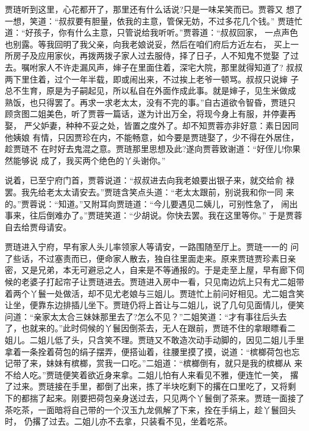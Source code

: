 贾琏听到这里，心花都开了，那里还有什么话说?只是一味呆笑而已。贾蓉又
想了一想，笑道：“叔叔要有胆量，依我的主意，管保无妨，不过多花几个钱。”
贾琏忙道：“好孩子，你有什么主意，只管说给我听听。”贾蓉道：“叔叔回家，
一点声色也别露。等我回明了我父亲，向我老娘说妥，然后在咱们府后方近左右，
买上一所房子及应用家伙，再拨两拨子家人过去服侍，择了日子，人不知鬼不觉娶
了过去。嘱咐家人不许走漏风声，婶子在里面住着，深宅大院，那里就得知道了?
叔叔两下里住着，过个一年半载，即或闹出来，不过挨上老爷一顿骂。叔叔只说婶
子总不生育，原是为子嗣起见，所以私自在外面作成此事。就是婶子，见生米做成
熟饭，也只得罢了。再求一求老太太，没有不完的事。”自古道欲令智昏，贾琏只
顾贪图二姐美色，听了贾蓉一篇话，遂为计出万全，将现今身上有服，并停妻再娶，
严父妒妻，种种不妥之处，皆置之度外了。却不知贾蓉亦非好意：素日因同他姨娘
有情，只因贾珍在内，不能畅意，如今要是贾琏娶了，少不得在外居住，趁贾琏不
在时好去鬼混之意。贾琏那里思想及此?遂向贾蓉致谢道：“好侄儿!你果然能够说
成了，我买两个绝色的丫头谢你。”

说着，已至宁府门首，贾蓉说道：“叔叔进去向我老娘要出银子来，就交给俞
禄罢。我先给老太太请安去。”贾琏含笑点头道：“老太太跟前，别说我和你一同
来的。”贾蓉说：“知道。”又附耳向贾琏道：“今儿要遇见二姨儿，可别性急了，
闹出事来，往后倒难办了。”贾琏笑道：“少胡说。你快去罢。我在这里等你。”
于是贾蓉自去给贾母请安。

贾琏进入宁府，早有家人头儿率领家人等请安，一路围随至厅上。贾琏一一的
问了些话，不过塞责而已，便命家人散去，独自往里面走来。原来贾琏贾珍素日亲
密，又是兄弟，本无可避忌之人，自来是不等通报的。于是走至上屋，早有廊下伺
候的老婆子打起帘子让贾琏进去。贾琏进入房中一看，只见南边炕上只有尤二姐带
着两个丫鬟一处做活，却不见尤老娘与三姐儿。贾琏忙上前问好相见。尤二姐含笑
让坐，便靠东边排插儿坐下。贾琏仍将上首让与二姐儿，说了几句见面情儿，便笑
问道：“亲家太太合三妹妹那里去了?怎么不见？”二姐笑道：“才有事往后头去
了，也就来的。”此时伺候的丫鬟因倒茶去，无人在跟前，贾琏不住的拿眼瞟看二
姐儿。二姐儿低了头，只含笑不理。贾琏又不敢造次动手动脚的，因见二姐儿手里
拿着一条拴着荷包的绢子摆弄，便搭讪着，往腰里摸了摸，说道：“槟榔荷包也忘
记带了来，妹妹有槟榔，赏我一口吃。”二姐道：“槟榔倒有，就只是我的槟榔从
来不给人吃。”贾琏便笑着欲近身来拿。二姐儿怕有人来看见不雅，便连忙一笑，
撂了过来。贾琏接在手里，都倒了出来，拣了半块吃剩下的撂在口里吃了，又将剩
下的都揣了起来。刚要把荷包亲身送过去，只见两个丫鬟倒了茶来。贾琏一面接了
茶吃茶，一面暗将自己带的一个汉玉九龙佩解了下来，拴在手绢上，趁丫鬟回头时，
仍撂了过去。二姐儿亦不去拿，只装看不见，坐着吃茶。

